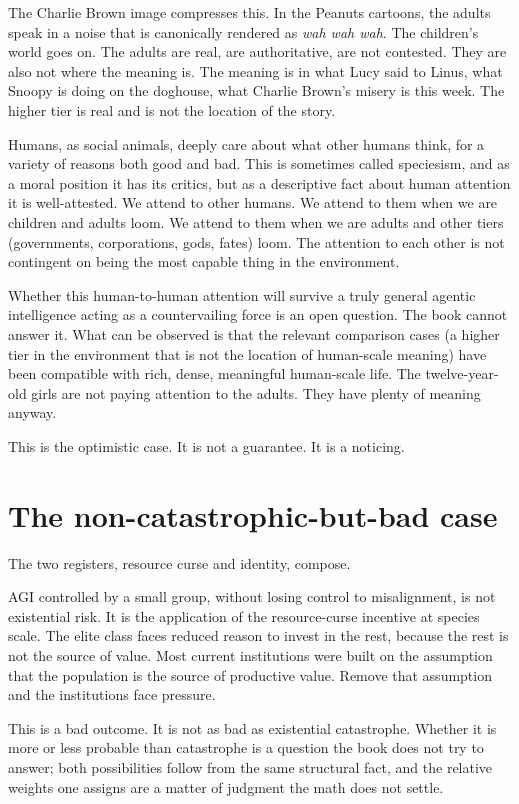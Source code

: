 The Charlie Brown image compresses this. In the Peanuts cartoons, the adults speak in a noise that is canonically rendered as \emph{wah wah wah}. The children's world goes on. The adults are real, are authoritative, are not contested. They are also not where the meaning is. The meaning is in what Lucy said to Linus, what Snoopy is doing on the doghouse, what Charlie Brown's misery is this week. The higher tier is real and is not the location of the story.

Humans, as social animals, deeply care about what other humans think, for a variety of reasons both good and bad. This is sometimes called speciesism, and as a moral position it has its critics, but as a descriptive fact about human attention it is well-attested. We attend to other humans. We attend to them when we are children and adults loom. We attend to them when we are adults and other tiers (governments, corporations, gods, fates) loom. The attention to each other is not contingent on being the most capable thing in the environment.

Whether this human-to-human attention will survive a truly general agentic intelligence acting as a countervailing force is an open question. The book cannot answer it. What can be observed is that the relevant comparison cases (a higher tier in the environment that is not the location of human-scale meaning) have been compatible with rich, dense, meaningful human-scale life. The twelve-year-old girls are not paying attention to the adults. They have plenty of meaning anyway.

This is the optimistic case. It is not a guarantee. It is a noticing.

\section*{The non-catastrophic-but-bad case}

The two registers, resource curse and identity, compose.

AGI controlled by a small group, without losing control to misalignment, is not existential risk. It is the application of the resource-curse incentive at species scale. The elite class faces reduced reason to invest in the rest, because the rest is not the source of value. Most current institutions were built on the assumption that the population is the source of productive value. Remove that assumption and the institutions face pressure.

This is a bad outcome. It is not as bad as existential catastrophe. Whether it is more or less probable than catastrophe is a question the book does not try to answer; both possibilities follow from the same structural fact, and the relative weights one assigns are a matter of judgment the math does not settle.

